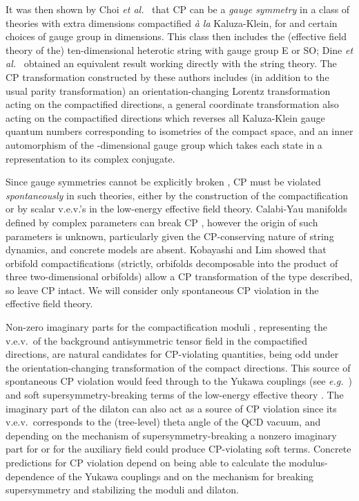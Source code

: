 \documentclass[a4paper,12pt]{article}
\begin{document}
It was then shown by Choi {\em et al.\/}\ \cite{ChoiKN} that CP can be a {\em gauge symmetry}\/ in a class of theories with \coordHE{} extra dimensions compactified {\em \`a la}\/ Kaluza-Klein, for \coordHE{} and certain choices of gauge group in \coordHE{} dimensions. This class then includes the (effective field theory of the) ten-dimensional heterotic string with gauge group E\coordHE{} or SO\coordHE{}; Dine {\em et al.\/}\ \cite{DineLM} obtained an equivalent result working directly with the string theory. The CP transformation constructed by these authors includes (in addition to the usual parity transformation) an orientation-changing Lorentz transformation acting on the compactified directions, a general coordinate transformation also acting on the compactified directions which reverses all Kaluza-Klein gauge quantum numbers corresponding to isometries of the compact space, and an inner automorphism of the \coordHE{}-dimensional gauge group which takes each state in a representation to its complex conjugate.

Since gauge symmetries cannot be explicitly broken \cite{Krauss:1989zc}, CP must be violated {\em spontaneously}\/ in such theories, either by the construction of the compactification or by scalar v.e.v.'s in the low-energy effective field theory. Calabi-Yau manifolds defined by complex parameters can break CP \cite{StroWitten85}, however the origin of such parameters is unknown, particularly given the CP-conserving nature of string dynamics, and concrete models are absent. Kobayashi and Lim \cite{KobayashiL} showed that orbifold compactifications (strictly, \coordHE{} orbifolds decomposable into the product of three two-dimensional orbifolds) allow a CP transformation of the type described, so leave CP intact. We will consider only spontaneous CP violation in the effective field theory.

Non-zero imaginary parts for the compactification moduli \coordHE{}, representing the v.e.v.\ of the background antisymmetric tensor field in the compactified directions, are natural candidates for CP-violating quantities, being odd under the orientation-changing transformation of the compact directions. This source of spontaneous CP violation would feed through to the Yukawa couplings (see {\em e.g.\/}\ \cite{BailinLS93}) and soft supersymmetry-breaking terms of the low-energy effective theory \cite{IbanezLust,Bailin:1998iz+97}. The imaginary part of the dilaton \coordHE{} can also act as a source of CP violation since its v.e.v.\ corresponds to the (tree-level) theta angle of the QCD vacuum, and depending on the mechanism of supersymmetry-breaking a nonzero imaginary part for \coordHE{} or for the auxiliary field \coordHE{} could produce CP-violating soft terms. Concrete predictions for CP violation depend on being able to calculate the modulus-dependence of the Yukawa couplings and on the mechanism for breaking supersymmetry and stabilizing the moduli and dilaton.
\end{document}
